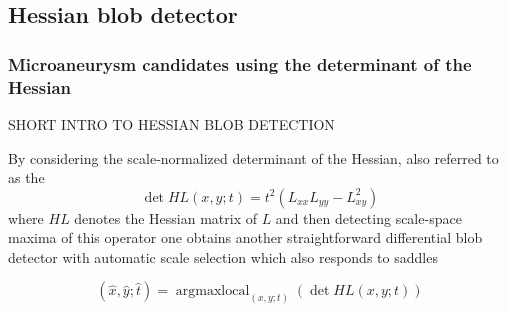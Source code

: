 \subsection{Hessian blob detector}
\begin{frame}\frametitle{Microaneurysm candidates using the determinant of the Hessian}
\par SHORT INTRO TO HESSIAN BLOB DETECTION

\par By considering the scale-normalized determinant of the Hessian, also referred to as the 
\[ \operatorname{det} HL(x, y; t) = t^2 (L_{xx} L_{yy} - L_{xy}^2) \]
where $HL$ denotes the Hessian matrix of $L$ and then detecting scale-space maxima of this operator one obtains another straightforward differential blob detector with automatic scale selection which also responds to saddles

\[(\hat{x}, \hat{y}; \hat{t}) = \operatorname{argmaxlocal}_{(x, y; t)}(\operatorname{det} H L(x, y; t))\]
\end{frame}

